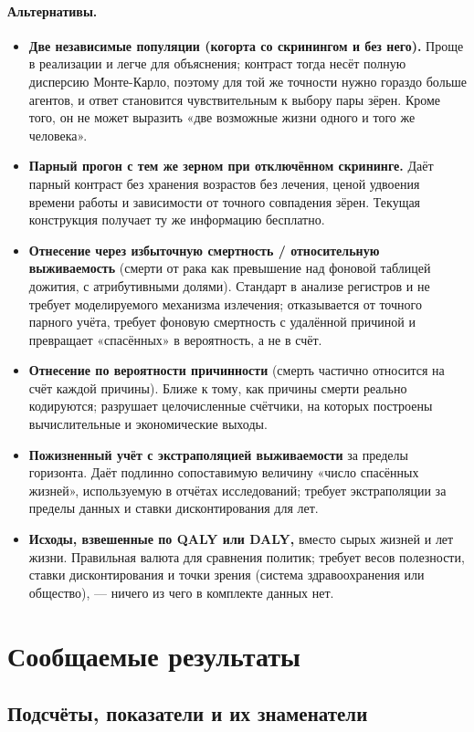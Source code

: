\documentclass[12pt,a4paper]{article}
\newcommand{\alt}[1]{\paragraph{Альтернативы.} #1}
\begin{document}
\alt{\begin{itemize}[nosep]
  \item \textbf{Две независимые популяции (когорта со скринингом и без него).} Проще в реализации и легче для
        объяснения; контраст тогда несёт полную дисперсию Монте-Карло, поэтому для той же точности нужно
        гораздо больше агентов, и ответ становится чувствительным к выбору пары зёрен. Кроме того, он не
        может выразить «две возможные жизни одного и того же человека».
  \item \textbf{Парный прогон с тем же зерном при отключённом скрининге.} Даёт парный контраст без хранения
        возрастов без лечения, ценой удвоения времени работы и зависимости от точного совпадения зёрен.
        Текущая конструкция получает ту же информацию бесплатно.
  \item \textbf{Отнесение через избыточную смертность / относительную выживаемость} (смерти от рака как
        превышение над фоновой таблицей дожития, с атрибутивными долями). Стандарт в анализе регистров и не
        требует моделируемого механизма излечения; отказывается от точного парного учёта, требует фоновую
        смертность с удалённой причиной и превращает «спасённых» в вероятность, а не в счёт.
  \item \textbf{Отнесение по вероятности причинности} (смерть частично относится на счёт каждой причины).
        Ближе к тому, как причины смерти реально кодируются; разрушает целочисленные счётчики, на которых
        построены вычислительные и экономические выходы.
  \item \textbf{Пожизненный учёт с экстраполяцией выживаемости} за пределы горизонта. Даёт подлинно
        сопоставимую величину «число спасённых жизней», используемую в отчётах исследований; требует
        экстраполяции за пределы данных и ставки дисконтирования для лет.
  \item \textbf{Исходы, взвешенные по QALY или DALY,} вместо сырых жизней и лет жизни. Правильная валюта для
        сравнения политик; требует весов полезности, ставки дисконтирования и точки зрения (система
        здравоохранения или общество), --- ничего из чего в комплекте данных нет.
\end{itemize}}

\section{Сообщаемые результаты}

\subsection{Подсчёты, показатели и их знаменатели}
\end{document}
